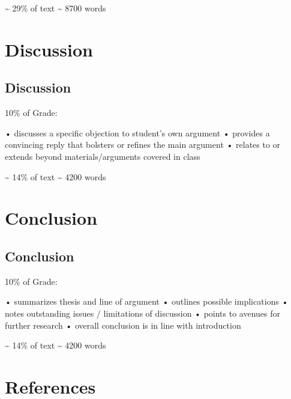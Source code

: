 \documentclass[12pt,a4paper]{report}      %
\begin{document}
\textasciitilde{} 29\% of text \textasciitilde{} 8700 words


\chapter{Discussion}\label{discussion}

\section{Discussion}\label{discussion-1}

10\% of Grade:

• discusses a specific objection to student's own argument • provides a
convincing reply that bolsters or refines the main argument • relates to
or extends beyond materials/arguments covered in class

\textasciitilde{} 14\% of text \textasciitilde{} 4200 words


\chapter{Conclusion}\label{conclusion}

\section{Conclusion}\label{conclusion-1}

10\% of Grade:

• summarizes thesis and line of argument • outlines possible
implications • notes outstanding issues / limitations of discussion •
points to avenues for further research • overall conclusion is in line
with introduction

\textasciitilde{} 14\% of text \textasciitilde{} 4200 words


\chapter*{References}\label{references}


\label{refs}

\cleardoublepage
{}
{}
\appendix
\end{document}
